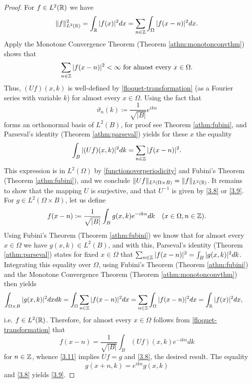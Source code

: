 \begin{theorem}
	\begin{proof}
		For $f \in L^{2}(\mathbb{R})$ we have
		\begin{equation}
			\| f \|_{L^{2}(\mathbb{R})}^{2} = \int_{\mathbb{R}} |f(x)|^{2} dx = \sum_{n \in \mathbb{Z}} \int_{\Omega} |f(x - n)|^{2} dx.\label{functionoverperiodicity}
		\end{equation} 
		Apply the Monotone Convergence Theorem (Theorem \ref{athm:monotonconvthm}) shows that
		\[ \sum_{n \in \mathbb{Z}} |f(x - n)|^{2} < \infty \text{ for almost every } x \in \Omega.\]
		Thus, $(Uf)(x, k)$ is well-defined by \eqref{floquet-transformation} (as a Fourier series with variable $k$) for almost every $x \in \Omega$. Using the fact that 
		\[ \vartheta_{n}(k) \coloneqq \frac{1}{\sqrt{|B|}} e^{ikn} \]
		forms an orthonormal basis of $L^{2}(B)$, for proof see Theorem \ref{athm:fubini}, and Parseval's identity (Theorem \ref{athm:parseval}) yields for these $x$ the equality
		\[ \int_{B}|(Uf)(x,k)|^{2} dk = \sum_{n \in \mathbb{Z}} |f(x - n)|^{2}. \]
	 	This expression is in $L^{2}(\Omega)$ by \eqref{functionoverperiodicity} and Fubini's Theorem (Theorem \ref{athm:fubini}), and we conclude $\| Uf \|_{L^{2}(\Omega \times B)} = \|f\|_{L^{2}(\mathbb{R})}$. It remains to show that the mapping $U$ is surjective, and that $U^{-1}$ is given by \eqref{3.8} or \eqref{3.9}. For $g \in L^{2}(\Omega \times B)$, let us define
		\begin{equation}
			f(x - n) \coloneqq \frac{1}{\sqrt{|B|}} \int_{B} g(x, k) e^{-ikn} dk \quad (x \in \Omega, n \in\mathbb{Z}).\label{3.11}
		\end{equation}
		Using Fubini's Theorem (Theorem \ref{athm:fubini}) we know that for almost every $x \in \Omega$ we have $g(x, k) \in L^{2}(B)$, and with this, Parseval's identity (Theorem \ref{athm:parseval}) states for fixed $x \in \Omega$ that $\sum_{n \in \mathbb{Z}} |f(x - n)|^{2} = \int_{B} |g(x, k)|^{2} dk$. Integrating this equality over $\Omega$, using Fubini's Theorem (Theorem \ref{athm:fubini}) and the Monotone Convergence Theorem (Theorem \ref{athm:monotonconvthm}) then yields
		\begin{align*}
			\int_{\Omega \times B} |g(x, k)|^{2} dx dk & = \int_{\Omega} \sum_{n \in \mathbb{Z}} |f(x - n)|^{2} dx  = \sum_{n \in\mathbb{Z}} \int_{\Omega} |f(x-n)|^{2} dx = \int_{\mathbb{R}} |f(x)|^{2} dx,	
		\end{align*}
		i.e. $f \in L^{2}(\mathbb{R})$. Therefore, for almost every $x \in \Omega$ follows from \eqref{floquet-transformation} that
		\[ f(x - n) = \frac{1}{\sqrt{|B|}} \int_{B} (Uf)(x,k) e^{-ikn} dk \]
		for $n \in \mathbb{Z}$, whence \eqref{3.11} implies $U f = g$ and \eqref{3.8}, the desired result. The equality  
		\[ g(x + n, k) = e^{ikn} g(x, k) \]
		and \eqref{3.8} yields \eqref{3.9}.
	\end{proof}				
\end{theorem}

